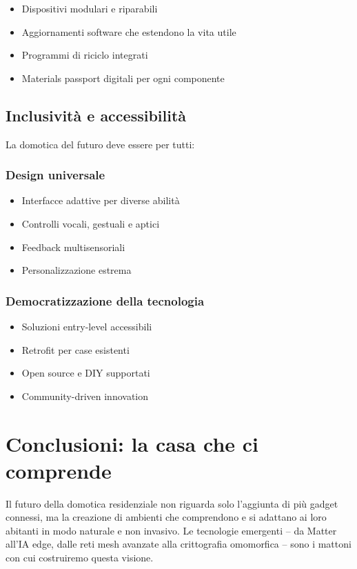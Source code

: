 \begin{itemize}
    \item Dispositivi modulari e riparabili
    \item Aggiornamenti software che estendono la vita utile
    \item Programmi di riciclo integrati
    \item Materials passport digitali per ogni componente
\end{itemize}

\subsection{Inclusività e accessibilità}

La domotica del futuro deve essere per tutti:

\subsubsection{Design universale}

\begin{itemize}
    \item Interfacce adattive per diverse abilità
    \item Controlli vocali, gestuali e aptici
    \item Feedback multisensoriali
    \item Personalizzazione estrema
\end{itemize}

\subsubsection{Democratizzazione della tecnologia}

\begin{itemize}
    \item Soluzioni entry-level accessibili
    \item Retrofit per case esistenti
    \item Open source e DIY supportati
    \item Community-driven innovation
\end{itemize}

\section{Conclusioni: la casa che ci comprende}

Il futuro della domotica residenziale non riguarda solo l'aggiunta di più gadget connessi, ma la creazione di ambienti che comprendono e si adattano ai loro abitanti in modo naturale e non invasivo. Le tecnologie emergenti -- da Matter all'IA edge, dalle reti mesh avanzate alla crittografia omomorfica -- sono i mattoni con cui costruiremo questa visione.

